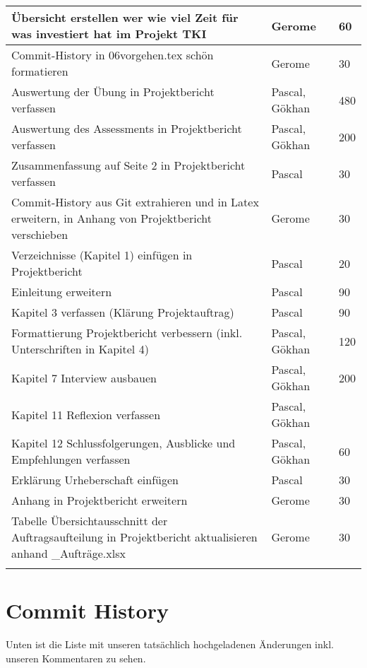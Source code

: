 \begin{longtable}{ | p{7cm} | p{4cm} | p{2cm} |}
    Übersicht erstellen wer wie viel Zeit für was investiert hat im Projekt TKI & Gerome & 60\\ \hline   
    Commit-History in 06vorgehen.tex schön formatieren & Gerome & 30 \\ \hline 
    Auswertung der Übung in Projektbericht verfassen  & Pascal, Gökhan & 480 \\ \hline   
Auswertung des Assessments in Projektbericht verfassen & Pascal, Gökhan & 200 \\ \hline  
Zusammenfassung auf Seite 2 in Projektbericht verfassen     & Pascal & 30 \\ \hline   
Commit-History aus Git extrahieren und in Latex erweitern, in Anhang von Projektbericht verschieben     & Gerome & 30 \\ \hline
 Verzeichnisse (Kapitel 1) einfügen in Projektbericht    & Pascal & 20 \\ \hline  
 Einleitung erweitern    & Pascal & 90 \\ \hline   
 Kapitel 3 verfassen (Klärung Projektauftrag)    & Pascal & 90 \\ \hline
 Formattierung Projektbericht verbessern (inkl. Unterschriften in Kapitel 4)    & Pascal, Gökhan & 120 \\ \hline  
 Kapitel 7 Interview ausbauen  & Pascal, Gökhan & 200 \\ \hline   
 Kapitel 11 Reflexion verfassen & Pascal, Gökhan &  \\ \hline    
 Kapitel 12 Schlussfolgerungen, Ausblicke und Empfehlungen    verfassen & Pascal, Gökhan & 60 \\ \hline  
 Erklärung Urheberschaft einfügen & Pascal & 30 \\ \hline   
 Anhang in Projektbericht erweitern & Gerome & 30 \\ \hline     
 Tabelle Übersichtausschnitt der Auftragsaufteilung in Projektbericht aktualisieren anhand \_Aufträge.xlsx    & Gerome & 30 \\ \hline    
     &  &  \\ \hline  
     
\end{longtable}
     
\newpage

\section*{Commit History}
 

Unten ist die Liste mit unseren tatsächlich hochgeladenen Änderungen inkl. unseren Kommentaren zu sehen.

